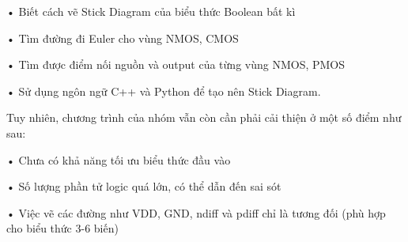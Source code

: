 \documentclass[a4paper,12pt]{article}
\begin{document}
• Biết cách vẽ Stick Diagram của biểu thức Boolean bất kì

• Tìm đường đi Euler cho vùng NMOS, CMOS

• Tìm được điểm nối nguồn và output của từng vùng NMOS, PMOS

• Sử dụng ngôn ngữ C++ và Python để tạo nên Stick Diagram.

Tuy nhiên, chương trình của nhóm vẫn còn cần phải cải thiện ở một số điểm như sau: 

• Chưa có khả năng tối ưu biểu thức đầu vào

• Số lượng phần tử logic quá lớn, có thể dẫn đến sai sót

• Việc vẽ các đường như VDD, GND, ndiff và pdiff chỉ là tương đối (phù hợp cho biểu thức 3-6 biến)
\end{document}
